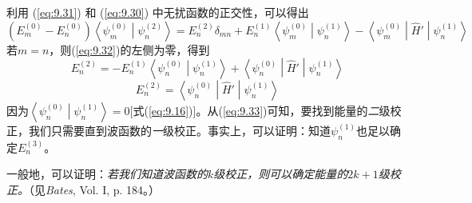     利用 (\ref{eq:9.31}) 和 (\ref{eq:9.30}) 中无扰函数的正交性，可以得出
    \begin{equation}
        \left(E_m^{\left(0\right)} - E_n^{\left(0\right)}\right)\left\langle \psi_m^{\left(0\right)} \middle| \psi_n^{\left(2\right)} \right\rangle = E_n^{\left(2\right)} \delta_{mn} + E_n^{\left(1\right)} \left\langle \psi_m^{\left(0\right)} \middle| \psi_n^{\left(1\right)} \right\rangle - \left\langle \psi_m^{\left(0\right)} \middle| \hat{H}' \middle| \psi_n^{\left(1\right)} \right\rangle
        \label{eq:9.32}
    \end{equation}
    若$m=n$，则(\ref{eq:9.32})的左侧为零，得到
    \begin{equation*}
        E_n^{\left(2\right)} = - E_n^{\left(1\right)} \left\langle \psi_n^{\left(0\right)} \middle| \psi_n^{\left(1\right)} \right\rangle + \left\langle \psi_n^{\left(0\right)} \middle| \hat{H}' \middle| \psi_n^{\left(1\right)} \right\rangle 
    \end{equation*}
    \begin{equation}
        E_n^{\left(2\right)} = \left\langle \psi_n^{\left(0\right)} \middle| \hat{H}' \middle| \psi_n^{\left(1\right)} \right\rangle
        \label{eq:9.33}
    \end{equation}
    因为$\left\langle \psi_n^{\left(0\right)} \middle| \psi_n^{\left(1\right)} \right\rangle = 0$[式(\ref{eq:9.16})]。从(\ref{eq:9.33})可知，要找到能量的\textit{二}级校正，我们只需要直到波函数的\textit{一}级校正。事实上，可以证明：知道$\psi_n^{\left(1\right)}$也足以确定$E_n^{\left(3\right)}$。

    一般地，可以证明：\textit{若我们知道波函数的$k$级校正，则可以确定能量的$2k+1$级校正。}（见\textit{Bates}, Vol. I, p. 184。）

